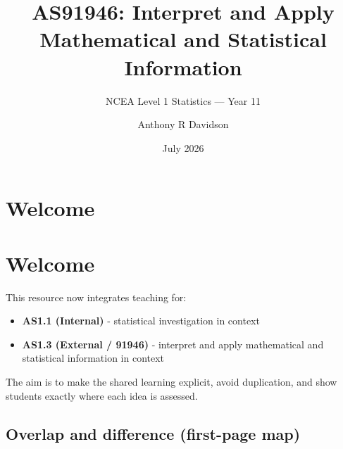 \documentclass[
  11pt,
  a4paper,
  oneside,
  open=any]{scrbook}
\title{AS91946: Interpret and Apply Mathematical and Statistical
Information}
\subtitle{NCEA Level 1 Statistics --- Year 11}
\author{Anthony R Davidson}
\date{July 2026}
\providecommand{\tightlist}{%
  \setlength{\itemsep}{0pt}\setlength{\parskip}{0pt}}
\renewcommand*\contentsname{Table of contents}
\newcommand\contentsname{Table of contents}
\begin{document}
\frontmatter
\maketitle

\renewcommand*\contentsname{Table of contents}
{
\hypersetup{linkcolor=}
\setcounter{tocdepth}{1}
\tableofcontents
}
\listoffigures
\listoftables

\mainmatter
{}

\chapter{Welcome}\label{welcome}


\chapter*{Welcome}\label{welcome-1}


This resource now integrates teaching for:

\begin{itemize}
\tightlist
\item
  \textbf{AS1.1 (Internal)} - statistical investigation in context
\item
  \textbf{AS1.3 (External / 91946)} - interpret and apply mathematical
  and statistical information in context
\end{itemize}

The aim is to make the shared learning explicit, avoid duplication, and
show students exactly where each idea is assessed.

\section{Overlap and difference (first-page
map)}\label{overlap-and-difference-first-page-map}
\end{document}
